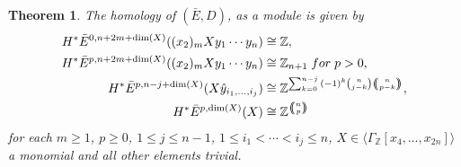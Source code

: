 \documentclass{article}
\theoremstyle{plain}
\newtheorem{thm}{Theorem}[section]
\theoremstyle{definition}
\numberwithin{thm}{section}
\begin{document}
			\begin{thm}\label{thm:SymFree}
				The homology of $(\bar{E},D)$, as a module is given by
					\begin{align*}
						H^*\bar{E}^{0,n+2m+\dim(X)}((x_2)_m X y_1\cdots y_n)&\cong\mathbb{Z}, \\
						H^*\bar{E}^{p,n+2m+\dim(X)}((x_2)_m X y_1\cdots y_n)&\cong\mathbb{Z}_{n+1} \; for \; p>0, \\
						H^*\bar{E}^{p,n-j+\dim(X)}(X \hat{y}_{i_1,\dots,i_j})&\cong\mathbb{Z}^{\sum_{k=0}^{n-j}{(-1)^k\binom{n}{j-k}{\ensuremath{\:\left(\kern-.5em\left(\genfrac{}{}{0pt}{}{{n}}{{p-k}}\right)\kern-.5em\right)\:}}}},\\
						H^*\bar{E}^{p,\dim(X)}(X)&\cong\mathbb{Z}^{{\ensuremath{\:\left(\kern-.5em\left(\genfrac{}{}{0pt}{}{{n}}{{p}}\right)\kern-.5em\right)\:}}}
					\end{align*}
				for each $m\geq 1$, $p\geq 0$, $1\leq j\leq n-1$, $1\leq i_1<\cdots<i_j\leq n$, $X\in\langle \Gamma_\mathbb{Z}[x_4,\dots,x_{2n}] \rangle$ a monomial
				and all other elements trivial.	
			\end{thm}
\end{document}
